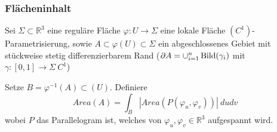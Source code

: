 \documentclass[../main.tex]{subfiles}
\begin{document}
\subsubsection*{Flächeninhalt}
Sei $\Sigma \subset \mathbb{R}^3$ eine reguläre Fläche $\varphi : U \to \Sigma$ eine lokale
Fläche $(C^1)$-Parametrisierung, sowie $A\subset \varphi (U) \subset \Sigma$ ein abgeschlossenes Gebiet
mit stückweise stetig differenzierbarem Rand ($\partial A=\cup  _{i=1}^n \operatorname{Bild}(\gamma _i)$ mit $\gamma : [0,1] \to \Sigma \ C^1$)

\begin{figure}[htb]
    \centering
    \def\svgwidth{15em}
    
\end{figure}

Setze $B = \varphi ^{-1}(A) \subset (U)$. Definiere
$$Area(A)=\int _B |Area(P(\varphi_u,\varphi_v))| \ dudv$$
wobei $P$ das Parallelogram ist, welches von $\varphi_u, \varphi_v \in \mathbb{R}^3$
aufgespannt wird.

\begin{figure}[htb]
    \centering
    \def\svgwidth{\textwidth}
    
\end{figure}
\end{document}
